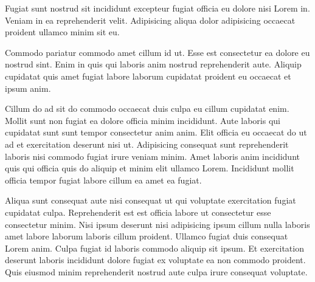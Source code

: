   Fugiat sunt nostrud sit incididunt excepteur fugiat officia eu dolore nisi Lorem in. Veniam in ea reprehenderit velit. Adipisicing aliqua dolor adipisicing occaecat proident ullamco minim sit eu.

  Commodo pariatur commodo amet cillum id ut. Esse est consectetur ea dolore eu nostrud sint. Enim in quis qui laboris anim nostrud reprehenderit aute. Aliquip cupidatat quis amet fugiat labore laborum cupidatat proident eu occaecat et ipsum anim.

  Cillum do ad sit do commodo occaecat duis culpa eu cillum cupidatat enim. Mollit sunt non fugiat ea dolore officia minim incididunt. Aute laboris qui cupidatat sunt sunt tempor consectetur anim anim. Elit officia eu occaecat do ut ad et exercitation deserunt nisi ut. Adipisicing consequat sunt reprehenderit laboris nisi commodo fugiat irure veniam minim. Amet laboris anim incididunt quis qui officia quis do aliquip et minim elit ullamco Lorem. Incididunt mollit officia tempor fugiat labore cillum ea amet ea fugiat.

  Aliqua sunt consequat aute nisi consequat ut qui voluptate exercitation fugiat cupidatat culpa. Reprehenderit est est officia labore ut consectetur esse consectetur minim. Nisi ipsum deserunt nisi adipisicing ipsum cillum nulla laboris amet labore laborum laboris cillum proident. Ullamco fugiat duis consequat Lorem anim. Culpa fugiat id laboris commodo aliquip sit ipsum. Et exercitation deserunt laboris incididunt dolore fugiat ex voluptate ea non commodo proident. Quis eiusmod minim reprehenderit nostrud aute culpa irure consequat voluptate.